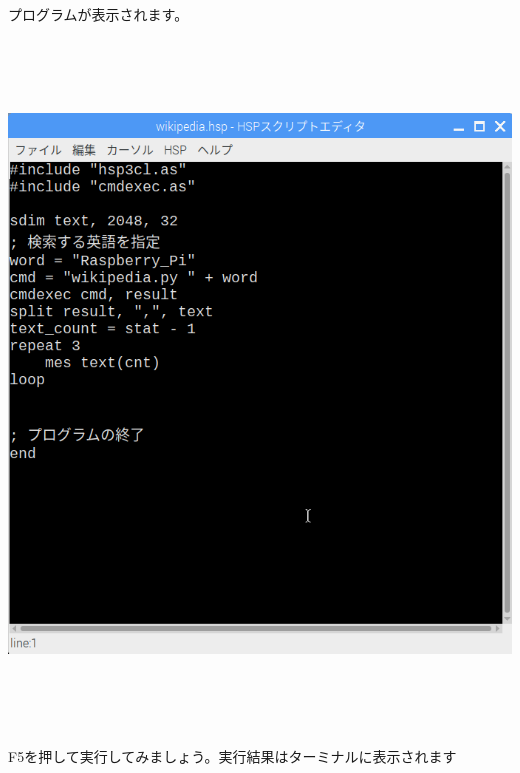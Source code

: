 \documentclass[a4paper,12pt,dvipdfmx]{jarticle}
\begin{document}
プログラムが表示されます。



\begin{center}
\includegraphics[width=17.006cm,height=18.251cm]{textbook-img060.png}

\end{center}

\bigskip

\clearpage
F5を押して実行してみましょう。実行結果はターミナルに表示されます
\end{document}
